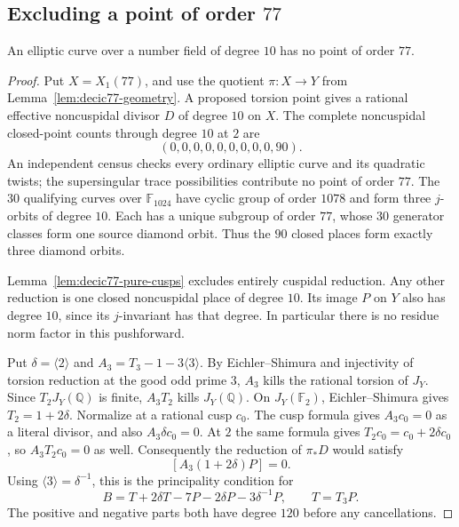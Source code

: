 \subsection{Excluding a point of order $77$}




\begin{proposition}\label{prop:decic-no77}
An elliptic curve over a number field of degree $10$ has no point
of order $77$.
\end{proposition}
\begin{proof}
Put $X=X_1(77)$, and use the quotient $\pi:X\to Y$ from
Lemma~\ref{lem:decic77-geometry}.
A proposed torsion point gives a rational effective noncuspidal
divisor $D$ of degree $10$ on $X$.
The complete noncuspidal closed-point counts through degree $10$
at $2$ are
\[
 (0,0,0,0,0,0,0,0,0,90).
\]
An independent census checks every ordinary elliptic curve and
its quadratic twists; the supersingular trace possibilities
contribute no point of order $77$.
The $30$ qualifying curves over $\mathbb F_{1024}$ have cyclic
group of order $1078$ and form three $j$-orbits of degree $10$.
Each has a unique subgroup of order $77$, whose $30$ generator
classes form one source diamond orbit.
Thus the $90$ closed places form exactly three diamond orbits.

Lemma~\ref{lem:decic77-pure-cusps} excludes entirely cuspidal
reduction.
Any other reduction is one closed noncuspidal place of degree
$10$. Its image $P$ on $Y$ also has degree $10$, since its
$j$-invariant has that degree.
In particular there is no residue norm factor in this pushforward.

Put $\delta=\langle2\rangle$ and
$A_3=T_3-1-3\langle3\rangle$.
By Eichler--Shimura and injectivity of torsion reduction at the
good odd prime $3$, $A_3$ kills the rational torsion of $J_Y$.
Since $T_2J_Y(\mathbb Q)$ is finite, $A_3T_2$ kills
$J_Y(\mathbb Q)$.
On $J_Y(\mathbb F_2)$, Eichler--Shimura gives
$T_2=1+2\delta$.
Normalize at a rational cusp $c_0$.
The cusp formula gives $A_3c_0=0$ as a literal divisor, and also
$A_3\delta c_0=0$. At $2$ the same formula gives
$T_2c_0=c_0+2\delta c_0$, so $A_3T_2c_0=0$ as well.
Consequently the reduction of $\pi_*D$ would satisfy
\[
 [A_3(1+2\delta)P]=0.
\]
Using $\langle3\rangle=\delta^{-1}$, this is the principality
condition for
\begin{equation}\label{eq:decic77-B}
 B=T+2\delta T-7P-2\delta P-3\delta^{-1}P,
 \qquad T=T_3P.
\end{equation}
The positive and negative parts both have degree $120$ before
any cancellations.


\end{proof}
